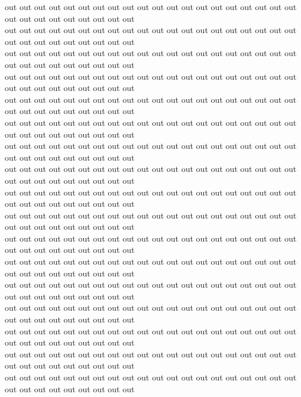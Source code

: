out out out out out out out out out out out out out out out out out out out out out out out out out out out out out\\
out out out out out out out out out out out out out out out out out out out out out out out out out out out out out\\
out out out out out out out out out out out out out out out out out out out out out out out out out out out out out\\
out out out out out out out out out out out out out out out out out out out out out out out out out out out out out\\
out out out out out out out out out out out out out out out out out out out out out out out out out out out out out\\
out out out out out out out out out out out out out out out out out out out out out out out out out out out out out\\
out out out out out out out out out out out out out out out out out out out out out out out out out out out out out\\
out out out out out out out out out out out out out out out out out out out out out out out out out out out out out\\
out out out out out out out out out out out out out out out out out out out out out out out out out out out out out\\
out out out out out out out out out out out out out out out out out out out out out out out out out out out out out\\
out out out out out out out out out out out out out out out out out out out out out out out out out out out out out\\
out out out out out out out out out out out out out out out out out out out out out out out out out out out out out\\
out out out out out out out out out out out out out out out out out out out out out out out out out out out out out\\
out out out out out out out out out out out out out out out out out out out out out out out out out out out out out\\
out out out out out out out out out out out out out out out out out out out out out out out out out out out out out\\
out out out out out out out out out out out out out out out out out out out out out out out out out out out out out\\
out out out out out out out out out out out out out out out out out out out out out out out out out out out out out\\
